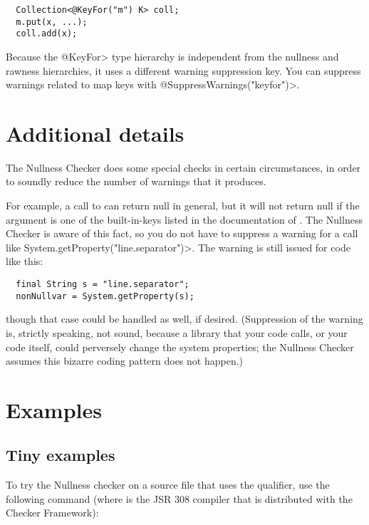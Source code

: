 \begin{Verbatim}
  Collection<@KeyFor("m") K> coll;
  m.put(x, ...);
  coll.add(x);
\end{Verbatim}


Because the \<@KeyFor> type hierarchy is independent from the nullness and
rawness hierarchies, it uses a different warning suppression key.
You can suppress warnings related to map keys with
\<@SuppressWarnings("keyfor")>.


\section{Additional details\label{nullness-additional-details}}

The Nullness Checker does some special checks in certain circumstances, in
order to soundly reduce the number of warnings that it produces.

For example, a call to 
can return null in general, but it will not return null if the argument is
one of the built-in-keys listed in the documentation of 
.
The Nullness Checker is aware of this fact, so you do not have to suppress
a warning for a call like \<System.getProperty("line.separator")>.  The
warning is still issued for code like this:

\begin{Verbatim}
  final String s = "line.separator";
  nonNullvar = System.getProperty(s);
\end{Verbatim}

\noindent
though that case could be handled as well, if desired.
(Suppression of the warning is, strictly speaking, not sound, because a
library that your code calls, or your code itself, could perversely change
the system properties; the Nullness Checker assumes this bizarre coding
pattern does not happen.)


\section{Examples\label{nullness-example}}

\subsection{Tiny examples\label{nullness-tiny-examples}}

To try the Nullness checker on a source file that uses the  qualifier,
use the following command (where  is the JSR 308 compiler that
is distributed with the Checker Framework):

